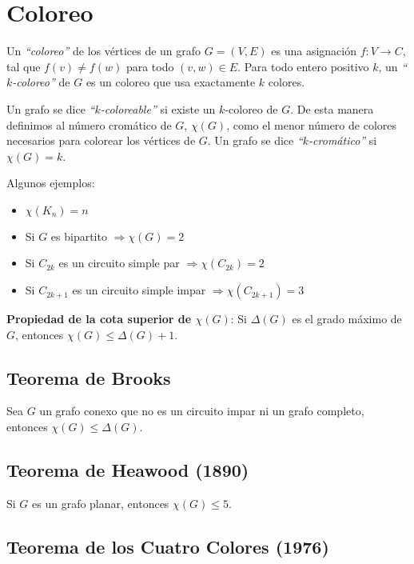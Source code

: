 \newpage
\section{Coloreo}

Un \emph{``coloreo''} de los v\'ertices de un grafo $G = (V, E)$ es una asignaci\'on $f : V \rightarrow C$, tal que $f(v) \neq f(w)$ para todo $(v,w) \in E$. Para todo entero positivo $k$, un \emph{``$k$-coloreo''} de $G$ es un coloreo que usa exactamente $k$ colores.

Un grafo se dice \emph{``$k$-coloreable''} si existe un $k$-coloreo de $G$. De esta manera definimos al n\'umero crom\'atico de $G$, $\chi(G)$, como el menor n\'umero de colores necesarios para colorear los v\'ertices de $G$. Un grafo se dice \emph{``$k$-crom\'atico''} si $\chi(G) = k$.

Algunos ejemplos:

\begin{itemize}
\item $\chi(K_n) = n$
\item Si $G$ es bipartito $\Rightarrow \chi(G) = 2$
\item Si $C_{2k}$ es un circuito simple par $\Rightarrow \chi(C_{2k}) = 2$
\item Si $C_{2k+1}$ es un circuito simple impar $\Rightarrow \chi(C_{2k+1}) = 3$
\end{itemize}

\textbf{Propiedad de la cota superior de $\chi(G)$}: Si $\Delta(G)$ es el grado m\'aximo de $G$, entonces $\chi(G) \leq \Delta(G) + 1$.

\subsection{Teorema de Brooks}

Sea $G$ un grafo conexo que no es un circuito impar ni un grafo completo, entonces $\chi(G) \leq \Delta(G)$.

\subsection{Teorema de Heawood (1890)}

Si $G$ es un grafo planar, entonces $\chi(G) \leq 5$.

\subsection{Teorema de los Cuatro Colores (1976)}

